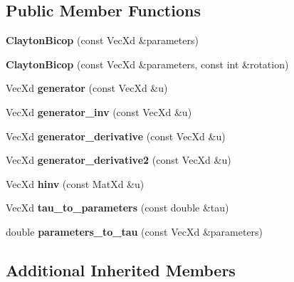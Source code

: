 \subsection*{Public Member Functions}
\begin{DoxyCompactItemize}
\item 
\hypertarget{class_clayton_bicop_a40ae835970aa67c3aacea800a831cc52}{{\bfseries Clayton\+Bicop} (const Vec\+Xd \&parameters)}\label{class_clayton_bicop_a40ae835970aa67c3aacea800a831cc52}

\item 
\hypertarget{class_clayton_bicop_a7b28e2ac34943f2b69616efffedcf720}{{\bfseries Clayton\+Bicop} (const Vec\+Xd \&parameters, const int \&rotation)}\label{class_clayton_bicop_a7b28e2ac34943f2b69616efffedcf720}

\item 
\hypertarget{class_clayton_bicop_a9763aabca37806261b8ecd6c46f4cf95}{Vec\+Xd {\bfseries generator} (const Vec\+Xd \&u)}\label{class_clayton_bicop_a9763aabca37806261b8ecd6c46f4cf95}

\item 
\hypertarget{class_clayton_bicop_a295caa6493575640a96201414dbf398f}{Vec\+Xd {\bfseries generator\+\_\+inv} (const Vec\+Xd \&u)}\label{class_clayton_bicop_a295caa6493575640a96201414dbf398f}

\item 
\hypertarget{class_clayton_bicop_ab009f6aa6036ad92d83a3d185e6234d8}{Vec\+Xd {\bfseries generator\+\_\+derivative} (const Vec\+Xd \&u)}\label{class_clayton_bicop_ab009f6aa6036ad92d83a3d185e6234d8}

\item 
\hypertarget{class_clayton_bicop_af24c631fbf12bcf3f52724fcf926cfef}{Vec\+Xd {\bfseries generator\+\_\+derivative2} (const Vec\+Xd \&u)}\label{class_clayton_bicop_af24c631fbf12bcf3f52724fcf926cfef}

\item 
\hypertarget{class_clayton_bicop_a3de44e26cffcac6d7e2511cc1ad56b04}{Vec\+Xd {\bfseries hinv} (const Mat\+Xd \&u)}\label{class_clayton_bicop_a3de44e26cffcac6d7e2511cc1ad56b04}

\item 
\hypertarget{class_clayton_bicop_a7ffb38cb5802a8d4d45f401ac5aab83b}{Vec\+Xd {\bfseries tau\+\_\+to\+\_\+parameters} (const double \&tau)}\label{class_clayton_bicop_a7ffb38cb5802a8d4d45f401ac5aab83b}

\item 
\hypertarget{class_clayton_bicop_a5eba5ab351ad17df7d633c7c96f6cbdf}{double {\bfseries parameters\+\_\+to\+\_\+tau} (const Vec\+Xd \&parameters)}\label{class_clayton_bicop_a5eba5ab351ad17df7d633c7c96f6cbdf}

\end{DoxyCompactItemize}
\subsection*{Additional Inherited Members}
